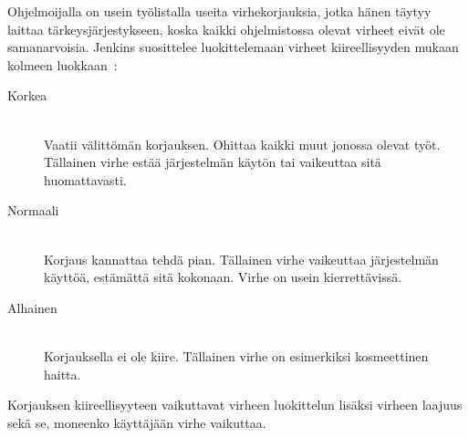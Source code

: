 \documentclass[finnish]{tktltiki2}
\theoremstyle{definition}
\theoremstyle{remark}
\begin{document}
Ohjelmoijalla on usein työlistalla useita virhekorjauksia, jotka hänen täytyy laittaa tärkeysjärjestykseen, koska kaikki ohjelmistossa olevat virheet eivät ole samanarvoisia.
Jenkins suosittelee luokittelemaan virheet kiireellisyyden mukaan kolmeen luokkaan~\cite{testing-primer}:
\begin{description}
  \item[Korkea] \hfill \\
  Vaatii välittömän korjauksen. Ohittaa kaikki muut jonossa olevat työt. Tällainen virhe estää järjestelmän käytön tai vaikeuttaa sitä huomattavasti.
  \item[Normaali] \hfill \\
  Korjaus kannattaa tehdä pian. Tällainen virhe vaikeuttaa järjestelmän käyttöä, estämättä sitä kokonaan. Virhe on usein kierrettävissä.
  \item[Alhainen] \hfill \\
  Korjauksella ei ole kiire. Tällainen virhe on esimerkiksi kosmeettinen haitta.
\end{description}
Korjauksen kiireellisyyteen vaikuttavat virheen luokittelun lisäksi virheen laajuus sekä se, moneenko käyttäjään virhe vaikuttaa.




\end{document}
